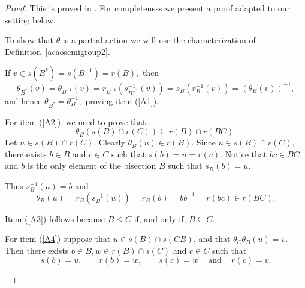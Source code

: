 \documentclass[11pt, a4paper]{amsart}
\theoremstyle{plain}
\begin{document}
\begin{proof}
This is proved in \cite[Proposition~5.3]{Exel}. For completeness we present a proof adapted to our setting below. 

To show that $\theta$ is a partial action we will use the characterization of Definition~\ref{acaosemigroup2}. 

If $v \in s(B^*)=s(B^{-1})=r(B),$ then
 $$\theta_{B^*}(v)=\theta_{B^{-1}}(v)=r_{B^{-1}}(s_{B^{-1}}^{-1}(v))= s_B(r_B^{-1}(v))=(\theta_{B}(v))^{-1},$$
and hence $\theta_{B^*}=\theta_B^{-1},$ proving item (\ref{A1}). 

For item (\ref{A2}), we need to prove that 
$$\theta_B(s(B)\cap r(C)) \subseteq r(B) \cap r(BC).$$
Let $u \in s(B) \cap r(C).$ Clearly $\theta_B(u) \in r(B).$ Since $u \in s(B) \cap r(C),$  there exists  $b \in B$ and $c \in C$ such that  $s(b)= u = r(c).$ Notice that  $bc \in BC$ and  $b$ is the only element of the bisection $B$ such that $s_B(b)=u.$ 


Thus $s_B^{-1}(u)=b$ and
 $$ \theta_B(u)=r_B(s_B^{-1}(u))=r_B(b)=bb^{-1}=r(bc) \in r(BC).$$

Item (\ref{A3}) follows because  $B \leq C$ if, and only if,  $B \subseteq C.$ 

For item (\ref{A4}) suppose that $u \in s(B)\cap s(CB)$, and that $\theta_C \theta_B(u)=v.$ Then there exists $b \in B, w \in r(B)\cap s(C)$ and $c \in C$ such that
  $$s(b)=u, \,\,\,\,\,\,\,\,\,\,\,\, r(b)=w, \,\,\,\,\,\,\,\,\,\,\,\, s(c)=w \,\,\,\,\,\,\, \mbox{and} \,\,\,\,\,\,\, r(c)=v.$$ 
  
\begin{center}
\end{center}
\end{proof}
\end{document}
